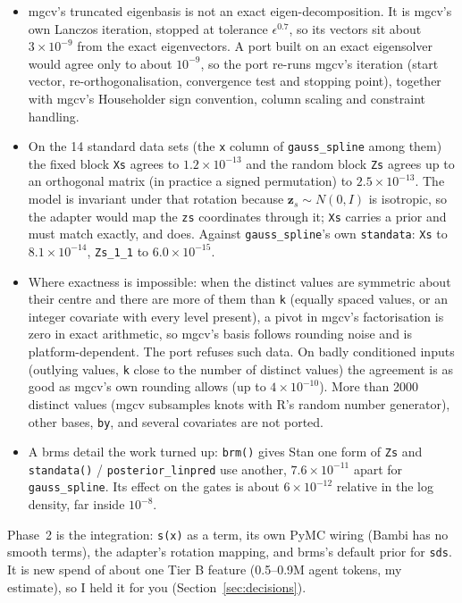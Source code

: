 \documentclass[11pt]{article}
\newcommand{\code}[1]{\texttt{#1}}
\begin{document}
\begin{itemize}
\item mgcv's truncated eigenbasis is not an exact eigen-decomposition. It is mgcv's own Lanczos iteration, stopped at
  tolerance $\epsilon^{0.7}$, so its vectors sit about $3\times10^{-9}$ from the exact eigenvectors. A port built on an
  exact eigensolver would agree only to about $10^{-9}$, so the port re-runs mgcv's iteration (start vector,
  re-orthogonalisation, convergence test and stopping point), together with mgcv's Householder sign convention, column
  scaling and constraint handling.
\item On the 14 standard data sets (the \code{x} column of \code{gauss\_spline} among them) the fixed block
  \code{Xs} agrees to $1.2\times10^{-13}$ and the random block \code{Zs} agrees up to an orthogonal matrix (in practice
  a signed permutation) to $2.5\times10^{-13}$. The model is invariant under that rotation because
  $\mathbf{z}_s \sim N(0, I)$ is isotropic, so the adapter would map the \code{zs} coordinates through it; \code{Xs}
  carries a prior and must match exactly, and does. Against \code{gauss\_spline}'s own \code{standata}: \code{Xs} to
  $8.1\times10^{-14}$, \code{Zs\_1\_1} to $6.0\times10^{-15}$.
\item Where exactness is impossible: when the distinct values are symmetric about their centre and there are more of
  them than \code{k} (equally spaced values, or an integer covariate with every level present), a pivot in mgcv's
  factorisation is zero in exact arithmetic, so mgcv's basis follows rounding noise and is platform-dependent. The port
  refuses such data. On badly conditioned inputs (outlying values, \code{k} close to the number of distinct values)
  the agreement is as good as mgcv's own rounding allows (up to $4\times10^{-10}$). More than 2000 distinct values
  (mgcv subsamples knots with R's random number generator), other bases, \code{by}, and several covariates are not
  ported.
\item A brms detail the work turned up: \code{brm()} gives Stan one form of \code{Zs} and \code{standata()} /
  \code{posterior\_linpred} use another, $7.6\times10^{-11}$ apart for \code{gauss\_spline}. Its effect on the gates is
  about $6\times10^{-12}$ relative in the log density, far inside $10^{-8}$.
\end{itemize}

\noindent Phase~2 is the integration: \code{s(x)} as a term, its own PyMC wiring (Bambi has no smooth terms), the
adapter's rotation mapping, and brms's default prior for \code{sds}. It is new spend of about one Tier B feature
(0.5--0.9M agent tokens, my estimate), so I held it for you (Section~\ref{sec:decisions}).
\end{document}
